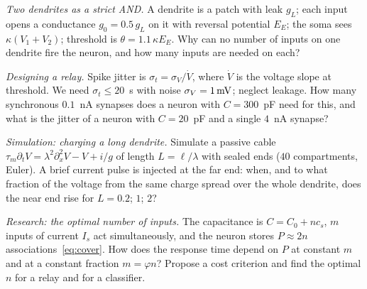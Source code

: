 \begin{exercise}[\lvlB]
\label{ex:19:4}
\emph{Two dendrites as a strict AND.} A dendrite is a patch with leak $g_L$; each input opens a conductance $g_0=0.5\,g_L$ on it with reversal potential $E_E$; the soma sees $\kappa(V_1+V_2)$; threshold is $\theta=1.1\,\kappa E_E$. Why can no number of inputs on one dendrite fire the neuron, and how many inputs are needed on each?
\end{exercise}

\begin{exercise}[\lvlB]
\label{ex:19:5}
\emph{Designing a relay.} Spike jitter is $\sigma_t=\sigma_V/\dot V$, where $\dot V$ is the voltage slope at threshold. We need $\sigma_t\le20$~\textmu s with noise $\sigma_V=1\,\text{mV}$; neglect leakage. How many synchronous $0.1$~nA synapses does a neuron with $C=300$~pF need for this, and what is the jitter of a neuron with $C=20$~pF and a single $4$~nA synapse?
\end{exercise}

\begin{exercise}[\lvlB]
\label{ex:19:6}
\emph{Simulation: charging a long dendrite.} Simulate a passive cable $\tau_m\partial_tV=\lambda^2\partial_x^2V-V+i/g$ of length $L=\ell/\lambda$ with sealed ends ($40$ compartments, Euler). A brief current pulse is injected at the far end: when, and to what fraction of the voltage from the same charge spread over the whole dendrite, does the near end rise for $L=0.2$; $1$; $2$?
\end{exercise}

\begin{exercise}[\lvlC]
\label{ex:19:7}
\emph{Research: the optimal number of inputs.} The capacitance is $C=C_0+nc_s$, $m$ inputs of current $I_s$ act simultaneously, and the neuron stores $P\approx2n$ associations~\eqref{eq:cover}. How does the response time depend on $P$ at constant $m$ and at a constant fraction $m=\varphi n$? Propose a cost criterion and find the optimal $n$ for a relay and for a classifier.
\end{exercise}

